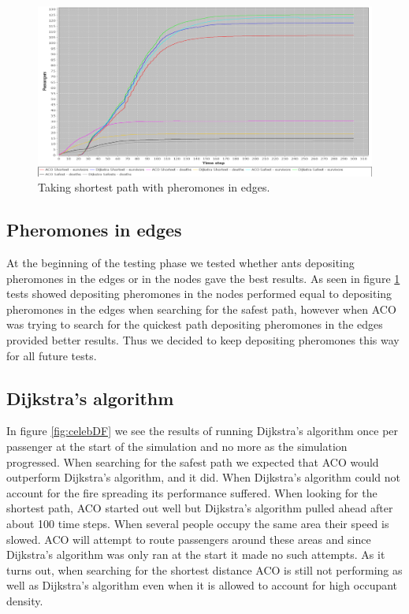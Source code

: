 \begin{figure} [h]
\centering
\hspace*{-1.0in}
\includegraphics[scale=0.35]{images/Graph-using-200-rounds-140-passangers-and-ACO-having-pheremons-in-edges.png}
\caption{Taking shortest path with pheromones in edges.}
\label{fig:celebPherInEdge}
\end{figure}
\subsection{Pheromones in edges}

At the beginning of the testing phase we tested whether ants depositing pheromones in the edges or in the nodes gave the best results.  As seen in figure \ref{fig:celebPherInEdge} tests showed depositing pheromones in the nodes performed equal to depositing pheromones in the edges when searching for the safest path, however when ACO was trying to search for the quickest path depositing pheromones in the edges provided better results. Thus we decided to keep depositing pheromones this way for all future tests.

\subsection{Dijkstra's algorithm}

In figure \ref{fig:celebDF} we see the results of running Dijkstra's algorithm once per passenger at the start of the simulation and no more as the simulation progressed. When searching for the safest path we expected that ACO would outperform Dijkstra's algorithm, and it did. When Dijkstra's algorithm could not account for the fire spreading its performance suffered. When looking for the shortest path, ACO started out well but Dijkstra's algorithm pulled ahead after about 100 time steps. When several people occupy the same area their speed is slowed. ACO will attempt to route passengers around these areas and since Dijkstra's algorithm was only ran at the start it made no such attempts. As it turns out, when searching for the shortest distance ACO is still not performing as well as Dijkstra's algorithm even when it is allowed to account for high occupant density.

